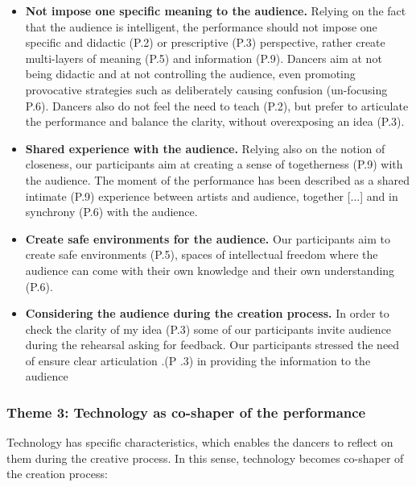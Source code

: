 \begin{itemize}
\item \textbf{Not impose one specific meaning to the audience.} Relying on the fact that the audience is intelligent, the performance should not impose one specific and didactic (P.2) or prescriptive (P.3) perspective, rather create multi-layers of meaning (P.5) and information (P.9). Dancers aim at not being didactic and at not controlling the audience, even promoting provocative strategies such as deliberately causing confusion (un-focusing P.6). Dancers also do not feel the need to teach (P.2), but prefer to articulate the performance and balance the clarity, without overexposing an idea (P.3).
\item \textbf{Shared experience with the audience.} Relying also on the notion of closeness, our participants aim at creating a sense of togetherness (P.9) with the audience. The moment of the performance has been described as a shared intimate (P.9) experience between artists and audience, together [...] and in synchrony (P.6) with the audience.
\item \textbf{Create safe environments for the audience.} Our participants aim to create safe environments (P.5), spaces of intellectual freedom where the audience can come with their own knowledge and their own understanding (P.6).
\item \textbf{Considering the audience during the creation process.} In order to check the clarity of my idea (P.3) some of our participants invite audience during the rehearsal asking for feedback. Our participants stressed the need of ensure clear articulation .(P .3) in providing the information to the audience
\end{itemize}

 
\subsubsection{Theme 3: Technology as co-shaper of the performance}

Technology has specific characteristics, which enables the dancers to reflect on them during the creative process. In this sense, technology becomes co-shaper of the creation process:


